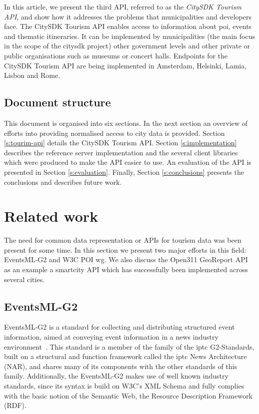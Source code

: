 \documentclass[times]{ettauth}
\begin{document}
In this article, we present the third API, referred to as the \emph{CitySDK Tourism API}, and show how it addresses the problems that municipalities and developers face. 
The CitySDK Tourism API enables access to information about \ac{poi}, events and thematic itineraries.
It can be implemented by municipalities (the main focus in the scope of the \ac{citysdk} project) other government levels and other private or public organisations such as museums or concert halls.
Endpoints for the CitySDK Tourism API are being implemented in Amsterdam, Helsinki, Lamia, Lisbon and Rome.

\subsection{Document structure}
\label{s:structure}
This document is organised into six sections.
In the next section an overview of efforts into providing normalised access to city data is provided.
Section \ref{s:tourim-api} details the CitySDK Tourism API.
Section \ref{s:implementation} describes the reference server implementation and the several client libraries which were produced to make the API easier to use.
An evaluation of the API is presented in  Section \ref{s:evaluation}. 
Finally, Section \ref{s:conclusions} presents the conclusions and describes future work.



\section{Related work}
\label{s:related-work}
The need for common data representation or APIs for tourism data was been present for some time.
In this section we present two major efforts in this field:  EventsML-G2 and \ac{W3C} \ac{POI} \ac{wg}.
We also discuss the Open311 GeoReport API as an example a smartcity API which has successfully been implemented across several cities.

\subsection{EventsML-G2}
EventsML-G2 is a standard for collecting and distributing structured event information, aimed at conveying event information in a news industry environment~\cite{eventsml}. 
This standard is a member of the family of the \ac{iptc} G2-Standards, built on a structural and function framework called the \ac{iptc} News Architecture (NAR), and shares many of its components with the other standards of this family. 
Additionally, the EventsML-G2 makes use of well known industry standards, since its syntax is build on W3C's XML Schema and fully complies with the basic notion of the Semantic Web, the Resource Description Framework (RDF).
\end{document}
